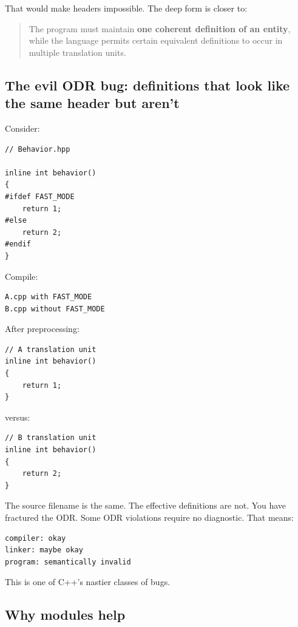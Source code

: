 That would make headers impossible. The deep form is closer to:

\begin{quote}
The program must maintain \textbf{one coherent definition of an entity}, while the language permits certain equivalent definitions to occur in multiple translation units.
\end{quote}

\subsection{The evil ODR bug: definitions that look like the same header but aren't}\label{01-foundations-i-ch002-the-evil-odr-bug-definitions-that-look-like-the-same-header-but-arent}

Consider:

\begin{verbatim}
// Behavior.hpp

inline int behavior()
{
#ifdef FAST_MODE
    return 1;
#else
    return 2;
#endif
}
\end{verbatim}

Compile:

\begin{verbatim}
A.cpp with FAST_MODE
B.cpp without FAST_MODE
\end{verbatim}

After preprocessing:

\begin{verbatim}
// A translation unit
inline int behavior()
{
    return 1;
}
\end{verbatim}

versus:

\begin{verbatim}
// B translation unit
inline int behavior()
{
    return 2;
}
\end{verbatim}

The source filename is the same. The effective definitions are not. You have fractured the ODR. Some ODR violations require no diagnostic. That means:

\begin{verbatim}
compiler: okay
linker: maybe okay
program: semantically invalid
\end{verbatim}

This is one of C++'s nastier classes of bugs.

\subsection{Why modules help}\label{01-foundations-i-ch002-why-modules-help}

